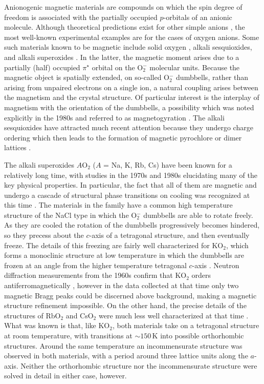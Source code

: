\documentclass[prb,aps,twocolumn,superscriptaddress,showpacs,footinbib]{revtex4-2}
\newcommand{\cso}{CsO$_{2}$ }
\newcommand{\rbo}{RbO$_{2}$ }
\begin{document}
Anionogenic magnetic materials are compounds on which the spin degree of freedom is associated with the partially occupied $p$-orbitals of an anionic molecule. Although theoretical predictions exist for other simple anions \cite{Volnianska2010}, the most well-known experimental examples are for the cases of oxygen anions. Some such materials known to be magnetic include solid oxygen \cite{Stephens1986,Felix2008,Klotz2010}, alkali sesquioxides, and alkali superoxides \cite{Hesse1989}. In the latter, the magnetic moment arises due to a partially (half) occupied $\pi^{\star}$ orbital on the O$_{2}^{-}$ molecular units. Because the magnetic object is spatially extended, on so-called O$_{2}^{-}$ dumbbells, rather than arising from unpaired electrons on a single ion, a natural coupling arises between the magnetism and the crystal structure. Of particular interest is the interplay of magnetism with the orientation of the dumbbells, a possibility which was noted explicitly in the 1980s and referred to as magnetogyration \cite{Boesch1980}. The alkali sesquioxides have attracted much recent attention because they undergo charge ordering which then leads to the formation of magnetic pyrochlore or dimer lattices \cite{Winterlik2009,Arcon2013,Adler2018,Colman2019,KnaflicPRB2020}.

The alkali superoxides $A$O$_{2}$ ($A$ = Na, K, Rb, Cs) have been known for a relatively long time, with studies in the 1970s and 1980s elucidating many of the key physical properties. In particular, the fact that all of them are magnetic and undergo a cascade of structural phase transitions on cooling was recognized at this time \cite{Hesse1989}. The materials in the family have a common high temperature structure of the NaCl type \cite{Ziegler1976} in which the O$_{2}^{-}$ dumbbells are able to rotate freely. As they are cooled the rotation of the dumbbells progressively becomes hindered, so they precess about the $c$-axis of a tetragonal structure, and then eventually freeze. The details of this freezing are fairly well characterized for KO$_{2}$, which forms a monoclinic structure at low temperature in which the dumbbells are frozen at an angle from the higher temperature tetragonal $c$-axis \cite{Halverson1962,Smith1966}. Neutron diffraction measurements from the 1960s confirm that KO$_{2}$ orders antiferromagnetically \cite{Smith1966}, however in the data collected at that time only two magnetic Bragg peaks could be discerned above background, making a magnetic structure refinement impossible. On the other hand, the precise details of the structures of \rbo and \cso were much less well characterized at that time \cite{Ziegler1976,Rosenfeld1978}. What was known is that, like KO$_{2}$, both materials take on a tetragonal structure at room temperature, with transitions at $\sim 150$\,K into possible orthorhombic structures. Around the same temperature an incommensurate structure was observed in both materials, with a period around three lattice units along the $a$-axis. Neither the orthorhombic structure nor the incommensurate structure were solved in detail in either case, however.
\end{document}
